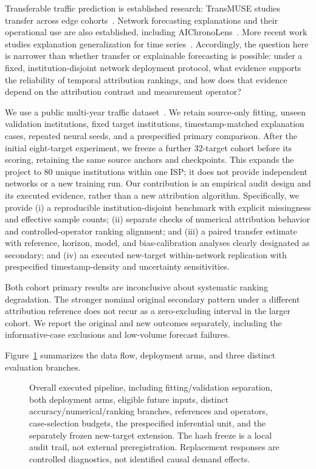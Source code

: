 \documentclass[conference]{IEEEtran}
\begin{document}
Transferable traffic prediction is established research: TransMUSE studies transfer across edge cohorts~\cite{transmuse}. Network forecasting explanations and their operational use are also established, including AIChronoLens~\cite{aichrono}. More recent work studies explanation generalization for time series~\cite{timesae}. Accordingly, the question here is narrower than whether transfer or explainable forecasting is possible: under a fixed, institution-disjoint network deployment protocol, what evidence supports the reliability of temporal attribution rankings, and how does that evidence depend on the attribution contrast and measurement operator?

We use a public multi-year traffic dataset~\cite{cesnet26,dataset}. We retain source-only fitting, unseen validation institutions, fixed target institutions, timestamp-matched explanation cases, repeated neural seeds, and a prespecified primary comparison. After the initial eight-target experiment, we freeze a further 32-target cohort before its scoring, retaining the same source anchors and checkpoints. This expands the project to 80 unique institutions within one ISP; it does not provide independent networks or a new training run. Our contribution is an empirical audit design and its executed evidence, rather than a new attribution algorithm. Specifically, we provide (i) a reproducible institution-disjoint benchmark with explicit missingness and effective sample counts; (ii) separate checks of numerical attribution behavior and controlled-operator ranking alignment; and (iii) a paired transfer estimate with reference, horizon, model, and bias-calibration analyses clearly designated as secondary; and (iv) an executed new-target within-network replication with prespecified timestamp-density and uncertainty sensitivities.

Both cohort primary results are inconclusive about systematic ranking degradation. The stronger nominal original secondary pattern under a different attribution reference does not recur as a zero-excluding interval in the larger cohort. We report the original and new outcomes separately, including the informative-case exclusions and low-volume forecast failures.

Figure~\ref{fig:pipeline} summarizes the data flow, deployment arms, and three distinct evaluation branches.

\begin{figure}[t]\centering
\resizebox{\textwidth}{!}{}
\caption{Overall executed pipeline, including fitting/validation separation, both deployment arms, eligible future inputs, distinct accuracy/numerical/ranking branches, references and operators, case-selection budgets, the prespecified inferential unit, and the separately frozen new-target extension. The hash freeze is a local audit trail, not external preregistration. Replacement responses are controlled diagnostics, not identified causal demand effects.}\label{fig:pipeline}
\end{figure}
\end{document}
